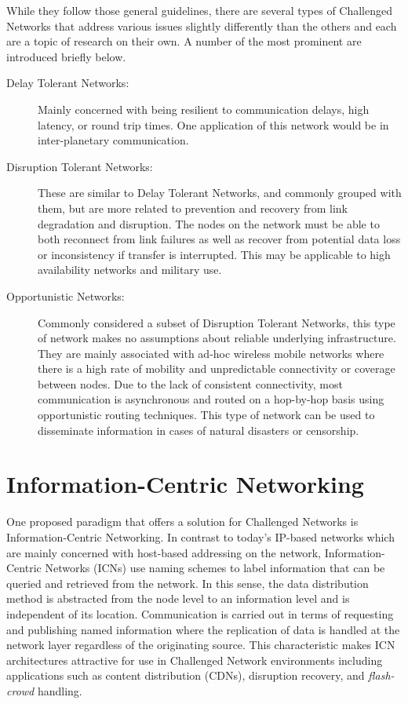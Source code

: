 \documentclass[a4paper,12pt]{report}      %
\begin{document}
While they follow those general guidelines, there are several types of Challenged Networks that
address various issues slightly differently than the others and each are a topic of research on their own.
A number of the most prominent are introduced briefly below.

\begin{description}
\item[Delay Tolerant Networks:] Mainly concerned with being resilient to communication delays, high
latency, or round trip times. One application of this network would be in inter-planetary
communication\cite{DTNarch}\cite{rfc4838}. 

\item[Disruption Tolerant Networks:] These are similar to Delay Tolerant Networks, and commonly grouped
with them, but are more related to prevention and recovery from link degradation and disruption. The
nodes on the network must be able to both reconnect from link failures as well as recover from
potential data loss or inconsistency if transfer is interrupted. This may be applicable to high availability
networks and military use\cite{DTNarch}.

\item[Opportunistic Networks:] Commonly considered a subset of Disruption Tolerant Networks, this type of
network makes no assumptions about reliable underlying infrastructure. They are mainly associated
with ad-hoc wireless mobile networks where there is a high rate of mobility and unpredictable
connectivity or coverage between nodes. Due to the lack of consistent connectivity, most
communication is asynchronous and routed on a hop-by-hop basis using opportunistic routing
techniques. This type of network can be used to disseminate information in cases of natural disasters or
censorship\cite{oppnets}.
\end{description}

\section{Information-Centric Networking}

One proposed paradigm that offers a solution for Challenged Networks is Information-Centric
Networking. In contrast to today's IP-based networks which are mainly concerned with host-based
addressing on the network, Information-Centric Networks (ICNs) use naming schemes to label
information that can be queried and retrieved from the network. In this sense, the data distribution
method is abstracted from the node level to an information level and is independent of its location.
Communication is carried out in terms of requesting and publishing named information where the
replication of data is handled at the network layer regardless of the originating source. This
characteristic makes ICN architectures attractive for use in Challenged Network environments
including applications such as content distribution (CDNs), disruption recovery, and \emph{flash-crowd}
handling.
\end{document}
